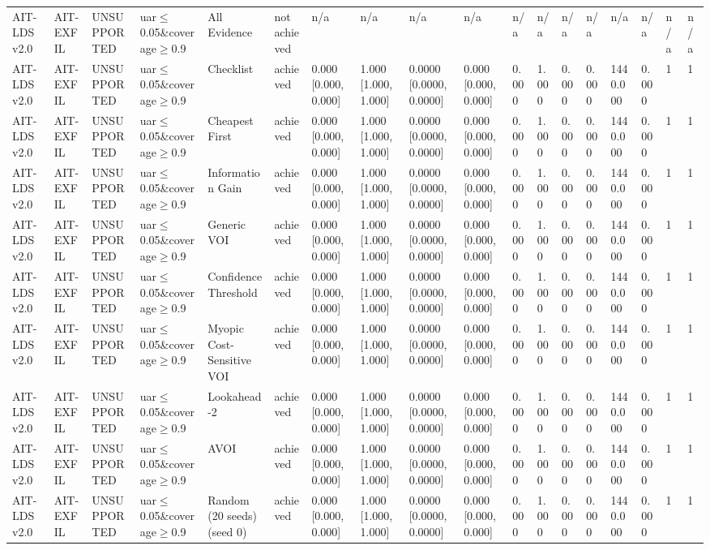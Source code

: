 \begin{table}[!ht]
{\begin{tabular}{llllllllllllllllll}
AIT-LDS v2.0 & AIT-EXFIL & UNSUPPORTED & uar$\le$0.05\&coverage$\ge$0.9 & All Evidence & not achieved & n/a & n/a & n/a & n/a & n/a & n/a & n/a & n/a & n/a & n/a & n/a & n/a \\
AIT-LDS v2.0 & AIT-EXFIL & UNSUPPORTED & uar$\le$0.05\&coverage$\ge$0.9 & Checklist & achieved & 0.000 [0.000, 0.000] & 1.000 [1.000, 1.000] & 0.0000 [0.0000, 0.0000] & 0.000 [0.000, 0.000] & 0.000 & 1.000 & 0.000 & 0.000 & 1440.000 & 0.000 & 1 & 1 \\
AIT-LDS v2.0 & AIT-EXFIL & UNSUPPORTED & uar$\le$0.05\&coverage$\ge$0.9 & Cheapest First & achieved & 0.000 [0.000, 0.000] & 1.000 [1.000, 1.000] & 0.0000 [0.0000, 0.0000] & 0.000 [0.000, 0.000] & 0.000 & 1.000 & 0.000 & 0.000 & 1440.000 & 0.000 & 1 & 1 \\
AIT-LDS v2.0 & AIT-EXFIL & UNSUPPORTED & uar$\le$0.05\&coverage$\ge$0.9 & Information Gain & achieved & 0.000 [0.000, 0.000] & 1.000 [1.000, 1.000] & 0.0000 [0.0000, 0.0000] & 0.000 [0.000, 0.000] & 0.000 & 1.000 & 0.000 & 0.000 & 1440.000 & 0.000 & 1 & 1 \\
AIT-LDS v2.0 & AIT-EXFIL & UNSUPPORTED & uar$\le$0.05\&coverage$\ge$0.9 & Generic VOI & achieved & 0.000 [0.000, 0.000] & 1.000 [1.000, 1.000] & 0.0000 [0.0000, 0.0000] & 0.000 [0.000, 0.000] & 0.000 & 1.000 & 0.000 & 0.000 & 1440.000 & 0.000 & 1 & 1 \\
AIT-LDS v2.0 & AIT-EXFIL & UNSUPPORTED & uar$\le$0.05\&coverage$\ge$0.9 & Confidence Threshold & achieved & 0.000 [0.000, 0.000] & 1.000 [1.000, 1.000] & 0.0000 [0.0000, 0.0000] & 0.000 [0.000, 0.000] & 0.000 & 1.000 & 0.000 & 0.000 & 1440.000 & 0.000 & 1 & 1 \\
AIT-LDS v2.0 & AIT-EXFIL & UNSUPPORTED & uar$\le$0.05\&coverage$\ge$0.9 & Myopic Cost-Sensitive VOI & achieved & 0.000 [0.000, 0.000] & 1.000 [1.000, 1.000] & 0.0000 [0.0000, 0.0000] & 0.000 [0.000, 0.000] & 0.000 & 1.000 & 0.000 & 0.000 & 1440.000 & 0.000 & 1 & 1 \\
AIT-LDS v2.0 & AIT-EXFIL & UNSUPPORTED & uar$\le$0.05\&coverage$\ge$0.9 & Lookahead-2 & achieved & 0.000 [0.000, 0.000] & 1.000 [1.000, 1.000] & 0.0000 [0.0000, 0.0000] & 0.000 [0.000, 0.000] & 0.000 & 1.000 & 0.000 & 0.000 & 1440.000 & 0.000 & 1 & 1 \\
AIT-LDS v2.0 & AIT-EXFIL & UNSUPPORTED & uar$\le$0.05\&coverage$\ge$0.9 & AVOI & achieved & 0.000 [0.000, 0.000] & 1.000 [1.000, 1.000] & 0.0000 [0.0000, 0.0000] & 0.000 [0.000, 0.000] & 0.000 & 1.000 & 0.000 & 0.000 & 1440.000 & 0.000 & 1 & 1 \\
AIT-LDS v2.0 & AIT-EXFIL & UNSUPPORTED & uar$\le$0.05\&coverage$\ge$0.9 & Random (20 seeds) (seed 0) & achieved & 0.000 [0.000, 0.000] & 1.000 [1.000, 1.000] & 0.0000 [0.0000, 0.0000] & 0.000 [0.000, 0.000] & 0.000 & 1.000 & 0.000 & 0.000 & 1440.000 & 0.000 & 1 & 1 \\

\end{tabular}}
\end{table}
